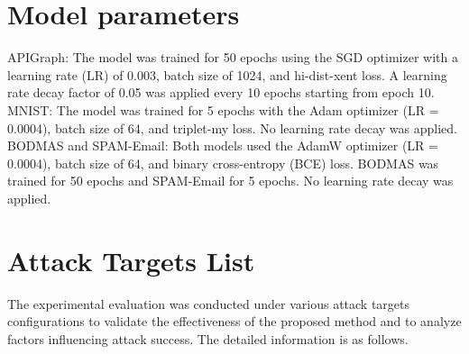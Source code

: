 \documentclass[lettersize,journal]{IEEEtran}
\begin{document}
\section*{Model parameters}
\label{Sec: Model parameters}
APIGraph: The model was trained for 50 epochs using the SGD optimizer with a learning rate (LR) of 0.003, batch size of 1024, and hi-dist-xent loss.
A learning rate decay factor of 0.05 was applied every 10 epochs starting from epoch 10.
MNIST: The model was trained for 5 epochs with the Adam optimizer (LR = 0.0004), batch size of 64, and triplet-my loss. No learning rate decay was applied.
BODMAS and SPAM-Email: Both models used the AdamW optimizer (LR = 0.0004), batch size of 64, and binary cross-entropy (BCE) loss.
BODMAS was trained for 50 epochs and SPAM-Email for 5 epochs. No learning rate decay was applied.

\section*{Attack Targets List}
\label{Sec: Attack Target List}
The experimental evaluation was conducted under various attack targets configurations to validate the effectiveness of the proposed method and to analyze factors influencing attack success.
The detailed information is as follows.
\end{document}

